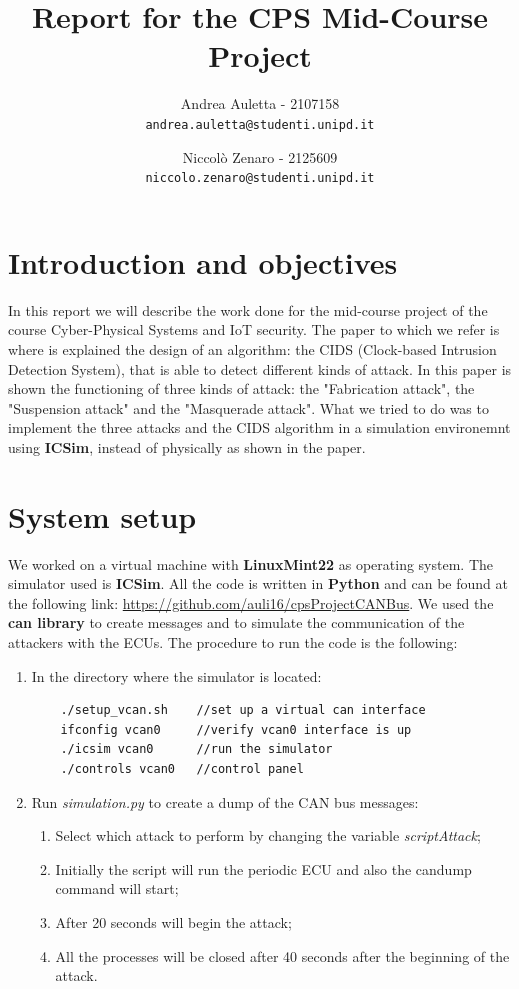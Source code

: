 \documentclass[12pt]{article}
\title{Report for the CPS Mid-Course Project}
\author{
    Andrea Auletta - 2107158 \\ \texttt{andrea.auletta@studenti.unipd.it} \and
    Niccolò Zenaro - 2125609 \\ \texttt{niccolo.zenaro@studenti.unipd.it}
}
\begin{document}
\maketitle
\newpage
\tableofcontents
\newpage

\section{Introduction and objectives}
In this report we will describe the work done for the mid-course project of the course 
Cyber-Physical Systems and IoT security. 
The paper to which we refer is \textbf{\cite{Cho2016} } where is explained 
the design of an algorithm: the CIDS (Clock-based Intrusion Detection System), that is able 
to detect different kinds of attack. In this paper is shown the functioning of three kinds 
of attack: the "Fabrication attack", the "Suspension attack" and the "Masquerade attack". 
What we tried to do was to implement the three attacks and the CIDS algorithm in a simulation 
environemnt using \textbf{ICSim}, instead of physically as shown in the paper.
\section{System setup}
We worked on a virtual machine with \textbf{LinuxMint22} as operating system.
The simulator used is \textbf{ICSim}. All the code is written in \textbf{Python} and can 
be found at the following link: \href{https://github.com/auli16/cpsProjectCANBus}{https://github.com/auli16/cpsProjectCANBus}.
We used the \textbf{can library} to create messages and to simulate the communication of the attackers with 
the ECUs.
The procedure to run the code is the following:
\begin{enumerate}
    \item In the directory where the simulator is located:
    \begin{verbatim}
    ./setup_vcan.sh    //set up a virtual can interface 
    ifconfig vcan0     //verify vcan0 interface is up
    ./icsim vcan0      //run the simulator
    ./controls vcan0   //control panel
    \end{verbatim}
    \item Run \textit{simulation.py} to create a dump of the CAN bus messages:
    \begin{enumerate}
        \item Select which attack to perform by changing the variable \textit{scriptAttack};
        \item Initially the script will run the periodic ECU and also the candump command
        will start;
        \item After 20 seconds will begin the attack;
        \item All the processes will be closed after 40 seconds after the beginning of the attack.
    \end{enumerate}
    
\end{enumerate}
\end{document}
